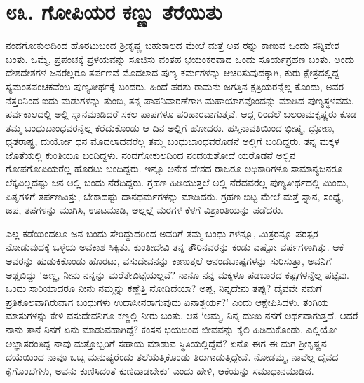 
\chapter{೮೩. ಗೋಪಿಯರ ಕಣ್ಣು ತೆರೆಯಿತು}

ನಂದಗೋಕುಲದಿಂದ ಹೊರಟುಬಂದ ಶ್ರೀಕೃಷ್ಣ ಬಹುಕಾಲದ ಮೇಲೆ ಮತ್ತೆ ಅವ ರನ್ನು ಕಾಣುವ ಒಂದು ಸನ್ನಿವೇಶ ಬಂತು. ಒಮ್ಮೆ, ಪ್ರಪಂಚಕ್ಕೆ ಪ್ರಳಯವನ್ನು ಸೂಚಿಸು ವಂತಹ ಭಯಂಕರವಾದ ಒಂದು ಸೂರ್ಯಗ್ರಹಣ ಬಂತು. ಅಂದು ದೇಶದೇಶಗಳ ಜನರೆಲ್ಲರೂ ತರ್ಪಣವೆ ಮೊದಲಾದ ಪುಣ್ಯ ಕರ್ಮಗಳನ್ನು ಆಚರಿಸುವುದಕ್ಕಾಗಿ, ಕುರು ಕ್ಷೇತ್ರದಲ್ಲಿದ್ದ ಸ್ಯಮಂತಪಂಚಕವೆಂಬ ಪುಣ್ಯತೀರ್ಥಕ್ಕೆ ಬಂದರು. ಹಿಂದೆ ಪರಶು ರಾಮನು ಜಗತ್ತಿನ ಕ್ಷತ್ರಿಯರನ್ನೆಲ್ಲ ಕೊಂದು, ಅವರ ನೆತ್ತರಿನಿಂದ ಐದು ಮಡುಗಳನ್ನು ತುಂಬಿ, ತನ್ನ ಪಾಪನಿವಾರಣೆಗಾಗಿ ಮಹಾಯಾಗವೊಂದನ್ನು ಮಾಡಿದ ಪುಣ್ಯಸ್ಥಳವದು. ಪರ್ವಕಾಲದಲ್ಲಿ ಅಲ್ಲಿ ಸ್ನಾನಮಾಡಿದರೆ ಸಕಲ ಪಾಪಗಳೂ ಪರಿಹಾರವಾಗುತ್ತವೆ. ಆದ್ದ ರಿಂದಲೆ ಬಲರಾಮಕೃಷ್ಣರು ಕೂಡ ತಮ್ಮ ಬಂಧುಬಾಂಧವರನ್ನೆಲ್ಲ ಕರೆದುಕೊಂಡು ಆ ದಿನ ಅಲ್ಲಿಗೆ ಹೋದರು. ಹಸ್ತಿನಾವತಿಯಿಂದ ಭೀಷ್ಮ, ದ್ರೋಣ, ಧೃತರಾಷ್ಟ್ರ, ದುರ್ಯೋ ಧನ ಮೊದಲಾದವರೆಲ್ಲ ತಮ್ಮ ಬಂಧುಬಾಂಧವರೊಡನೆ ಅಲ್ಲಿಗೆ ಬಂದಿದ್ದರು. ತನ್ನ ಮಕ್ಕಳ ಜೊತೆಯಲ್ಲಿ ಕುಂತಿಯೂ ಬಂದಿದ್ದಳು. ನಂದಗೋಕುಲದಿಂದ ನಂದಯಶೋದೆ ಯರೊಡನೆ ಅಲ್ಲಿನ ಗೋಪಗೋಪಿಯರೆಲ್ಲ ಹೊರಟು ಬಂದಿದ್ದರು. ಇನ್ನೂ ಅನೇಕ ದೇಶದ ರಾಜರೂ ಅಧಿಕಾರಿಗಳೂ ಸಾಮಾನ್ಯಜನರೂ ಲೆಕ್ಕವಿಲ್ಲದಷ್ಟು ಜನ ಅಲ್ಲಿ ಬಂದು ನೆರೆದಿದ್ದರು. ಗ್ರಹಣ ಹಿಡಿಯುತ್ತಲೆ ಅಲ್ಲಿ ನೆರೆದವರೆಲ್ಲ ಪುಣ್ಯತೀರ್ಥದಲ್ಲಿ ಮಿಂದು, ಪಿತೃಗಳಿಗೆ ತರ್ಪಣವಿತ್ತು, ಬೇಕಾದಷ್ಟು ದಾನಧರ್ಮಗಳನ್ನು ಮಾಡಿದರು. ಗ್ರಹಣ ಬಿಟ್ಟ ಮೇಲೆ ಮತ್ತೆ ಸ್ನಾನ, ಸಂಧ್ಯೆ, ಜಪ, ತಪಗಳನ್ನು ಮುಗಿಸಿ, ಊಟಮಾಡಿ, ಅಲ್ಲಲ್ಲೆ ಮರಗಳ ಕೆಳಗೆ ವಿಶ್ರಾಂತಿಯನ್ನು ಪಡೆದರು. 

ಎಲ್ಲ ಕಡೆಯಿಂದಲೂ ಜನ ಬಂದು ಸೇರಿದ್ದುದರಿಂದ ಅವರಿಗೆ ತಮ್ಮ ಬಂಧು ಗಳನ್ನೂ, ಮಿತ್ರರನ್ನೂ ಪರಸ್ಪರ ನೋಡುವುದಕ್ಕೆ ಒಳ್ಳೆಯ ಅವಕಾಶ ಸಿಕ್ಕಿತು. ಕುಂತೀದೇವಿ ತನ್ನ ತೌರಿನವರನ್ನು ಕಂಡು ಎಷ್ಟೋ ವರ್ಷಗಳಾಗಿತ್ತು. ಆಕೆ ಅವರನ್ನು ಹುಡುಕಿಕೊಂಡು ಹೊರಟು, ವಸುದೇವನನ್ನು ಕಾಣುತ್ತಲೆ ಆನಂದಬಾಷ್ಪಗಳನ್ನು ಸುರಿಸುತ್ತಾ, ಅವನಿಗೆ ಅಡ್ಡಬಿದ್ದು ‘ಅಣ್ಣ, ನೀನು ನನ್ನನ್ನು ಮರೆತೇಬಿಟ್ಟೆಯಲ್ಲವೆ? ನಾನೂ ನನ್ನ ಮಕ್ಕಳೂ ಪಡಬಾರದ ಕಷ್ಟಗಳನ್ನೆಲ್ಲ ಪಟ್ಟೆವು. ಒಂದು ಸಾರಿಯಾದರೂ ನೀನು ನಮ್ಮನ್ನು ಕಣ್ಣೆತ್ತಿ ನೋಡಿದೆಯಾ? ಅಪ್ಪ, ನಿನ್ನದೇನು ತಪ್ಪು? ದೈವವೇ ನಮಗೆ ಪ್ರತಿಕೂಲವಾಗಿರುವಾಗ ಬಂಧುಗಳು ಉದಾಸೀನರಾಗುವುದು ಏನಾಶ್ಚರ್ಯ?’ ಎಂದು ಆಕ್ಷೇಪಿಸಿದಳು. ತಂಗಿಯ ಮಾತುಗಳನ್ನು ಕೇಳಿ ವಸುದೇವನಿಗೂ ಕಣ್ಣಲ್ಲಿ ನೀರು ಬಂತು. ಆತ ‘ಅಮ್ಮ, ನಿನ್ನ ದುಃಖ ನನಗೆ ಅರ್ಥವಾಗುತ್ತದೆ. ಆದರೆ ನಾನು ತಾನೆ ನಿನಗೆ ಏನು ಮಾಡುವಹಾಗಿದ್ದೆ? ಕಂಸನ ಭಯದಿಂದ ಜೀವವನ್ನು ಕೈಲಿ ಹಿಡಿದುಕೊಂಡು, ಎಲ್ಲಿಯೋ ಅಜ್ಞಾತರಂತಿದ್ದ ನಾವು ಮತ್ತೊಬ್ಬರಿಗೆ ಸಹಾಯ ಮಾಡುವ ಸ್ಥಿತಿಯಲ್ಲಿದ್ದೆವೆ? ಏನೊ ಈಗ ಈ ಮಗ ಶ್ರೀಕೃಷ್ಣನ ದಯೆಯಿಂದ ನಾವೂ ಒಬ್ಬ ಮನುಷ್ಯರೆಂದು ತಲೆಯೆತ್ತಿಕೊಂಡು ತಿರುಗಾಡುತ್ತಿದ್ದೇವೆ. ನೋಡಮ್ಮ, ನಾವೆಲ್ಲ ದೈವದ ಕೈಗೊಂಬೆಗಳು, ಅವನು ಕುಣಿಸಿದಂತೆ ಕುಣಿದಾಡಬೇಕು’ ಎಂದು ಹೇಳಿ, ಆಕೆಯನ್ನು ಸಮಾಧಾನಮಾಡಿದ.

